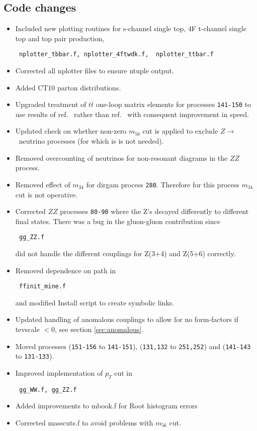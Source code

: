 \documentclass{article}
\begin{document}
{{{{{{\subsection{Code changes}
\begin{itemize}
\item
Included new plotting routines for s-channel single top, 4F t-channel single top and
top pair production,
\begin{verbatim} nplotter_tbbar.f, nplotter_4ftwdk.f,  nplotter_ttbar.f
\end{verbatim}
\item
Corrected all nplotter files to ensure ntuple output.
\item
Added CT10 parton distributions.
\item
Upgraded treatment of $t \bar{t}$ one-loop matrix elements for processes {\tt 141-150} to use results of 
ref.~\cite{Badger:2011yu} rather than ref.~\cite{Korner:2002hy} with consequent improvement in speed.
\item
Updated check on whether non-zero $m_{56}$ cut is applied to exclude $Z \to$~neutrino processes (for which is is not needed). 
\item
Removed overcounting of neutrinos for non-resonant diagrams in the $ZZ$ process.
\item
Removed effect of $m_{34}$ for dirgam process {\tt 280}. 
Therefore for this process $m_{34}$ cut is not operative.
\item
Corrected $ZZ$ processes {\tt 80-90} where the Z's decayed differently
to different final states. 
There was a bug in the gluon-gluon contribution since \begin{verbatim} gg_ZZ.f \end{verbatim} did not handle the 
different couplings for Z(3+4) and Z(5+6) correctly.
\item
Removed dependence on path in \begin{verbatim} ffinit_mine.f \end{verbatim} and modified Install script 
to create symbolic links.
\item
Updated handling of anomalous couplings to allow for no form-factors if tevscale $< 0$, see section \ref{sec:anomalous}.
\item
Moved processes ({\tt 151-156} to {\tt 141-151}), ({\tt 131,132} to {\tt 251,252}) and ({\tt 141-143} to {\tt 131-133}).
\item
Improved implementation of $p_T$ cut in 
\begin{verbatim} gg_WW.f, gg_ZZ.f \end{verbatim}
\item
Added improvements to mbook.f for Root histogram errors
\item
Corrected masscuts.f to avoid problems with $m_{56}$ cut.
\end{itemize}


}}}}}}
\end{document}
